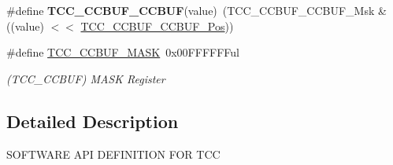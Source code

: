 \begin{DoxyCompactItemize}
\item 
\hypertarget{group___s_a_m_l21___t_c_c_ga22777d9289a516fa97d7ddc84b306227}{}\#define {\bfseries T\+C\+C\+\_\+\+C\+C\+B\+U\+F\+\_\+\+C\+C\+B\+U\+F}(value)~(T\+C\+C\+\_\+\+C\+C\+B\+U\+F\+\_\+\+C\+C\+B\+U\+F\+\_\+\+Msk \& ((value) $<$$<$ \hyperlink{group___s_a_m_l21___t_c_c_ga09e2b9e6a9175c4b3cb50fc6302c32c4}{T\+C\+C\+\_\+\+C\+C\+B\+U\+F\+\_\+\+C\+C\+B\+U\+F\+\_\+\+Pos}))\label{group___s_a_m_l21___t_c_c_ga22777d9289a516fa97d7ddc84b306227}

\item 
\hypertarget{group___s_a_m_l21___t_c_c_ga81967b211789a03191deb52dbf9987eb}{}\#define \hyperlink{group___s_a_m_l21___t_c_c_ga81967b211789a03191deb52dbf9987eb}{T\+C\+C\+\_\+\+C\+C\+B\+U\+F\+\_\+\+M\+A\+S\+K}~0x00\+F\+F\+F\+F\+F\+Ful\label{group___s_a_m_l21___t_c_c_ga81967b211789a03191deb52dbf9987eb}

\begin{DoxyCompactList}\small\item\em (T\+C\+C\+\_\+\+C\+C\+B\+U\+F) M\+A\+S\+K Register \end{DoxyCompactList}\end{DoxyCompactItemize}


\subsection{Detailed Description}
S\+O\+F\+T\+W\+A\+R\+E A\+P\+I D\+E\+F\+I\+N\+I\+T\+I\+O\+N F\+O\+R T\+C\+C 